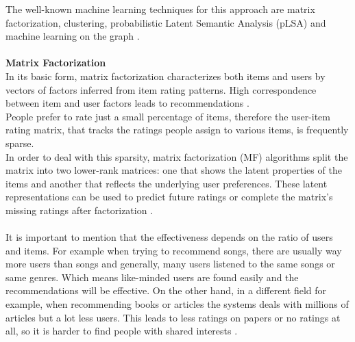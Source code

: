 \documentclass[\myFontSize,a4paper,oneside,english,hidelinks]{article}
\begin{document}
The well-known machine learning techniques for this approach are matrix factorization, clustering, probabilistic Latent Semantic Analysis (pLSA) and machine learning on the graph \cite{NILASHI2018507}. \\\\
%
%
%
\textbf{Matrix Factorization}\\
In its basic form, matrix factorization characterizes both items and users by vectors of factors inferred from item rating patterns. High correspondence between item and user factors leads to recommendations \cite{5197422}. \\
People prefer to rate just a small percentage of items, therefore the user-item rating matrix, that tracks the ratings people assign to various items, is frequently sparse.\\
In order to deal with this sparsity, matrix factorization (MF) algorithms split the matrix into two lower-rank matrices: one that shows the latent properties of the items and another that reflects the underlying user preferences. These latent representations can be used to predict future ratings or complete the matrix's missing ratings after factorization \cite{Tokala2023}.\\\\
%
%
%
It is important to mention that the effectiveness depends on the ratio of users and items. For example when trying to recommend songs, there are usually way more users than songs and generally, many users listened to the same songs or same genres. Which means like-minded users are found easily and the recommendations will be effective. On the other hand, in a different field for example, when recommending books or articles the systems deals with millions of articles but a lot less users. This leads to less ratings on papers or no ratings at all, so it is harder to find people with shared interests \cite{Beel2016305}.\\
\end{document}
